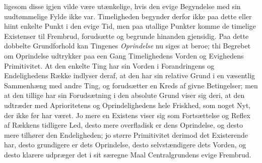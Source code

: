 \documentclass[12pt]{book}
\newcommand{\dsi}{\textup{ɔ:}}
\newcommand{\opage}[1]{\marginnote{\footnotesize\textit{[#1]}}}
\begin{document}
ligesom disse igjen vilde være utænkelige, hvis den evige Begyndelse med sin
uudtømmelige Fylde ikke var. Timeligheden begynder derfor ikke paa dette eller hiint
enkelte Punkt i den evige Tid, men paa utallige Punkter komme de timelige Existenser
til Frembrud, forudsætte og begrunde hinanden gjensidig. Paa dette dobbelte
Grundforhold kan Tingenes \emph{Oprindelse} nu siges at beroe; thi Begrebet om
Oprindelse udtrykker paa een Gang Timelighedens Vorden og Evighedens Primitivitet. At
den enkelte Ting har sin Vorden i Forandringens og Endelighedens Række indlyser
deraf, at den har sin relative Grund i en væsentlig Sammenhæng med andre Ting, og
\opage{131} %
forudsætter en Kreds af givne Betingelser; men at den tillige har sin Forudsætning i
den absolute Grund viser sig deri, at den udtræder med Aprioritetens og
Oprindelighedens hele Friskhed, som noget Nyt, der ikke før har været. Jo mere en
Existens viser sig som Fortsættelse og Reflex af Rækkens tidligere Led, desto mere
overfladisk er dens Oprindelse, og desto mere tilhører den Endeligheden; jo større
Primitivitet derimod det Existerende har, desto grundigere er dets Oprindelse, desto
selvstændigere dets Vorden, og desto klarere udpræger det i sit særegne Maal
Centralgrundens evige Frembrud.
\end{document}
